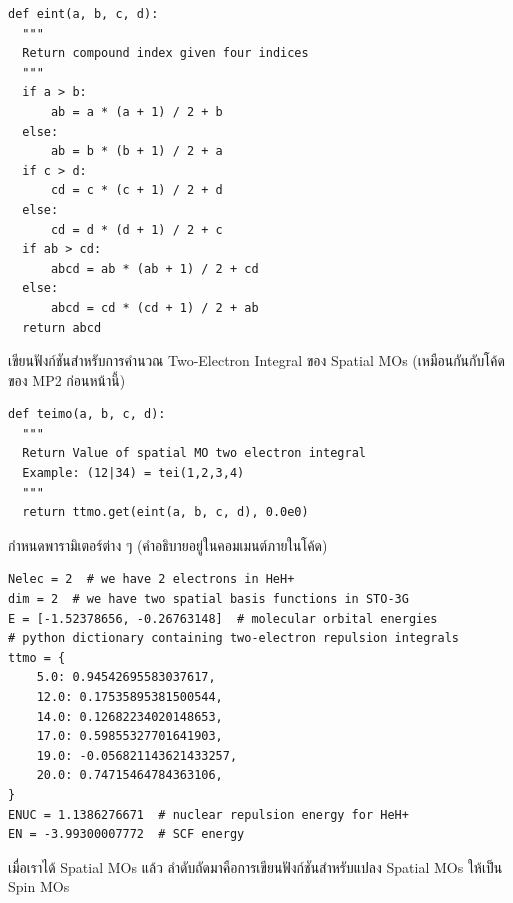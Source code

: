 \begin{lstlisting}[style=MyPython]
def eint(a, b, c, d):
  """
  Return compound index given four indices
  """
  if a > b:
      ab = a * (a + 1) / 2 + b
  else:
      ab = b * (b + 1) / 2 + a
  if c > d:
      cd = c * (c + 1) / 2 + d
  else:
      cd = d * (d + 1) / 2 + c
  if ab > cd:
      abcd = ab * (ab + 1) / 2 + cd
  else:
      abcd = cd * (cd + 1) / 2 + ab
  return abcd
\end{lstlisting}

\vspace{5pt}

\noindent เขียนฟังก์ชันสำหรับการคำนวณ Two-Electron Integral ของ Spatial MOs (เหมือนกันกับโค้ดของ MP2 ก่อนหน้านี้)

\vspace{5pt}

\begin{lstlisting}[style=MyPython]
def teimo(a, b, c, d):
  """
  Return Value of spatial MO two electron integral
  Example: (12|34) = tei(1,2,3,4)
  """
  return ttmo.get(eint(a, b, c, d), 0.0e0)
\end{lstlisting}

\vspace{5pt}

\noindent กำหนดพารามิเตอร์ต่าง ๆ (คำอธิบายอยู่ในคอมเมนต์ภายในโค้ด)

\vspace{5pt}

\begin{lstlisting}[style=MyPython]
Nelec = 2  # we have 2 electrons in HeH+
dim = 2  # we have two spatial basis functions in STO-3G
E = [-1.52378656, -0.26763148]  # molecular orbital energies
# python dictionary containing two-electron repulsion integrals
ttmo = {
    5.0: 0.94542695583037617,
    12.0: 0.17535895381500544,
    14.0: 0.12682234020148653,
    17.0: 0.59855327701641903,
    19.0: -0.056821143621433257,
    20.0: 0.74715464784363106,
}
ENUC = 1.1386276671  # nuclear repulsion energy for HeH+
EN = -3.99300007772  # SCF energy
\end{lstlisting}

\vspace{5pt}

\noindent เมื่อเราได้ Spatial MOs แล้ว ลำดับถัดมาคือการเขียนฟังก์ชันสำหรับแปลง Spatial MOs ให้เป็น Spin MOs

\vspace{5pt}

